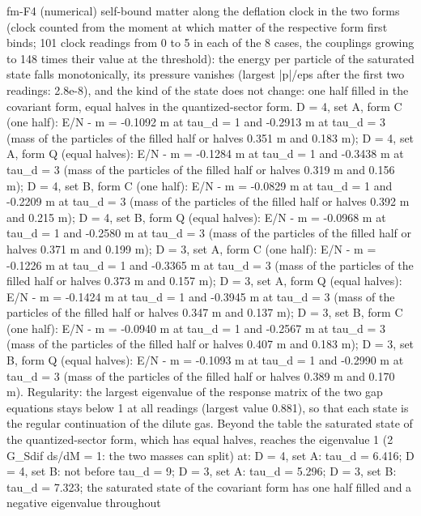 \documentclass[
  10pt,
]{article}
\newenvironment{Shaded}{}{}
\newcommand{\NormalTok}[1]{#1}
\begin{document}
\begin{Shaded}
\begin{Highlighting}[]
\NormalTok{[PASS] fm{-}F4  (numerical) self{-}bound matter along the deflation clock in the two forms (clock counted from the moment at which matter of the respective form first binds; 101 clock readings from 0 to 5 in each of the 8 cases, the couplings growing to 148 times their value at the threshold): the energy per particle of the saturated state falls monotonically, its pressure vanishes (largest |p|/eps after the first two readings: 2.8e{-}8), and the kind of the state does not change: one half filled in the covariant form, equal halves in the quantized{-}sector form. D = 4, set A, form C (one half): E/N {-} m = {-}0.1092 m at tau\_d = 1 and {-}0.2913 m at tau\_d = 3 (mass of the particles of the filled half or halves 0.351 m and 0.183 m); D = 4, set A, form Q (equal halves): E/N {-} m = {-}0.1284 m at tau\_d = 1 and {-}0.3438 m at tau\_d = 3 (mass of the particles of the filled half or halves 0.319 m and 0.156 m); D = 4, set B, form C (one half): E/N {-} m = {-}0.0829 m at tau\_d = 1 and {-}0.2209 m at tau\_d = 3 (mass of the particles of the filled half or halves 0.392 m and 0.215 m); D = 4, set B, form Q (equal halves): E/N {-} m = {-}0.0968 m at tau\_d = 1 and {-}0.2580 m at tau\_d = 3 (mass of the particles of the filled half or halves 0.371 m and 0.199 m); D = 3, set A, form C (one half): E/N {-} m = {-}0.1226 m at tau\_d = 1 and {-}0.3365 m at tau\_d = 3 (mass of the particles of the filled half or halves 0.373 m and 0.157 m); D = 3, set A, form Q (equal halves): E/N {-} m = {-}0.1424 m at tau\_d = 1 and {-}0.3945 m at tau\_d = 3 (mass of the particles of the filled half or halves 0.347 m and 0.137 m); D = 3, set B, form C (one half): E/N {-} m = {-}0.0940 m at tau\_d = 1 and {-}0.2567 m at tau\_d = 3 (mass of the particles of the filled half or halves 0.407 m and 0.183 m); D = 3, set B, form Q (equal halves): E/N {-} m = {-}0.1093 m}
\NormalTok{at tau\_d = 1 and {-}0.2990 m at tau\_d = 3 (mass of the particles of the filled half or halves 0.389 m and 0.170 m). Regularity: the largest eigenvalue of the response matrix of the two gap equations stays below 1 at all readings (largest value 0.881), so that each state is the regular continuation of the dilute gas. Beyond the table the saturated state of the quantized{-}sector form, which has equal halves, reaches the eigenvalue 1 (2 G\_Sdif ds/dM = 1: the two masses can split) at: D = 4, set A: tau\_d = 6.416; D = 4, set B: not before tau\_d = 9; D = 3, set A: tau\_d = 5.296; D = 3, set B: tau\_d = 7.323; the saturated state of the covariant form has one half filled and a negative eigenvalue throughout}

\end{Highlighting}
\end{Shaded}
\end{document}

